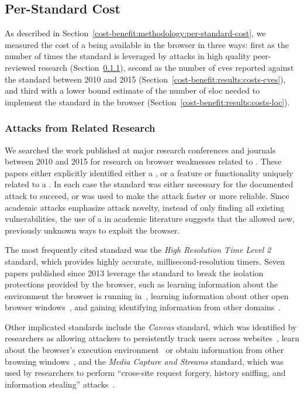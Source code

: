 \subsection{Per-Standard Cost}
\label{cost-benefit:results:results-costs}
As described in Section~\ref{cost-benefit:methodology:per-standard-cost}, we
measured the cost of a \WAS being available in the browser in three ways: first
as the number of times the standard is leveraged by attacks in high quality
peer-reviewed research (Section~\ref{cost-benefit:results:costs-research}),
second as the number of \gls{cve}s reported against the standard between 2010
and 2015 (Section~\ref{cost-benefit:results:costs-cves}), and third with a
lower bound estimate of the number of \gls{eloc} needed to implement the
standard in the browser (Section~\ref{cost-benefit:results:costs-loc}).


\subsubsection{Attacks from Related Research}
\label{cost-benefit:results:costs-research}
We searched the work published at major research conferences and journals
between 2010 and 2015 for research on browser weaknesses related to \WASs.
These papers either explicitly identified either a \WAS, or a feature or
functionality uniquely related to a \WAS.  In each case the standard was either
necessary for the documented attack to succeed, or was used to make the attack
faster or more reliable.  Since academic attacks emphasize attack novelty,
instead of only finding all existing vulnerabilities, the use of a \WAS in
academic literature suggests that the \WAS allowed new, previously unknown
ways to exploit the browser.

The most frequently cited standard was the \textit{High Resolution Time Level
2}~\cite{highres2016w3c} standard, which provides highly accurate,
millisecond-resolution timers.  Seven papers published since 2013 leverage the
standard to break the isolation protections provided by the browser, such as
learning information about the environment the browser is running
in~\cite{ho2014tick,oren2015spy,gruss2015practical}, learning information about
other open browser
windows~\cite{andrysco2015subnormal,kotcher2013cross,gruss2015practical}, and
gaining identifying information from other domains~\cite{van2015clock}.

Other implicated standards include the \textit{Canvas} standard, which was
identified by researchers as allowing attackers to persistently track users
across websites~\cite{acar2014web}, learn about the browser's execution
environment~\cite{ho2014tick} or obtain information from other browsing
windows~\cite{kotcher2013cross}, and the \textit{Media Capture and Streams}
standard, which was used by researchers to perform ``cross-site request
forgery, history sniffing, and information stealing''
attacks~\cite{tian2014all}.

